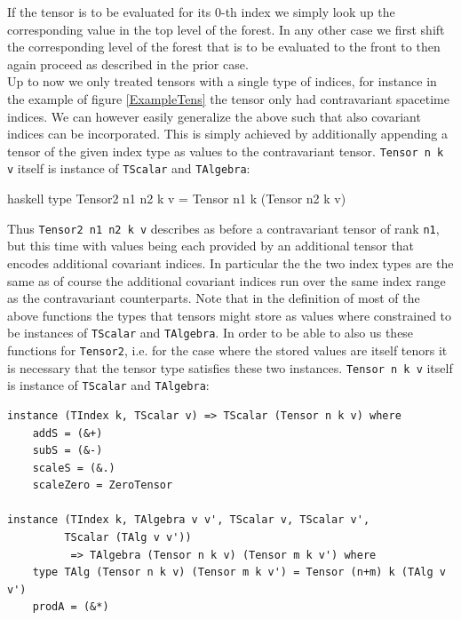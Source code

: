 \documentclass[a4paper,12pt, DIV=14, BCOR=5mm, twoside, headsepline]{scrbook}
\begin{document}
If the tensor is to be evaluated for its 0-th index we simply look up the corresponding value in the top level of the forest. In any other case we first shift the corresponding level of the forest that is to be evaluated to the front to then again proceed as described in the prior case.\\

Up to now we only treated tensors with a single type of indices, for instance in the example of figure \ref{ExampleTens} the tensor only had contravariant spacetime indices. We can however easily generalize the above such that also covariant indices can be incorporated. This is simply achieved by additionally appending a tensor of the given index type as values
to the contravariant tensor.
\texttt{Tensor n k v} itself is instance of \texttt{TScalar} and \texttt{TAlgebra}:
\begin{center}
\begin{cminted}{haskell}
type Tensor2 n1 n2 k v = Tensor n1 k (Tensor n2 k v)
\end{cminted}
\end{center}
Thus \texttt{Tensor2 n1 n2 k v} describes as before a contravariant tensor of rank \texttt{n1}, but this time with values being each provided by an additional tensor that encodes additional covariant indices. In particular the the two index types are the same as of course the additional covariant indices run over the same index range as the contravariant counterparts. 
Note that in the definition of most of the above functions the types that tensors might store as values where constrained to be instances of \texttt{TScalar} and \texttt{TAlgebra}. 
In order to be able to also us these functions for  \texttt{Tensor2}, i.e. for the case where the stored values are itself tenors it is necessary that the tensor type satisfies these two instances.
\texttt{Tensor n k v} itself is instance of \texttt{TScalar} and \texttt{TAlgebra}:

\begin{samepage} 
\begin{verbatim}
instance (TIndex k, TScalar v) => TScalar (Tensor n k v) where
    addS = (&+)
    subS = (&-)
    scaleS = (&.)
    scaleZero = ZeroTensor

instance (TIndex k, TAlgebra v v', TScalar v, TScalar v', 
         TScalar (TAlg v v')) 
          => TAlgebra (Tensor n k v) (Tensor m k v') where 
    type TAlg (Tensor n k v) (Tensor m k v') = Tensor (n+m) k (TAlg v v')
    prodA = (&*)
\end{verbatim} 
\end{samepage}
\end{document}

